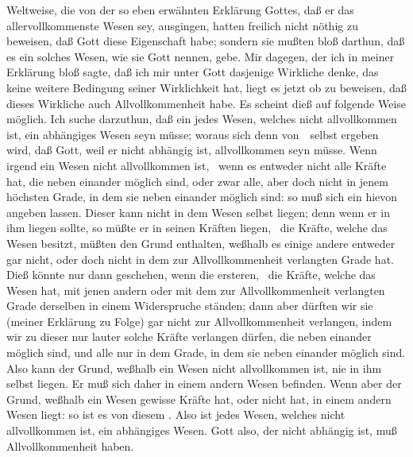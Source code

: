 \begin{aufza}
\item Weltweise, die von der so eben erwähnten Erklärung Gottes, daß er das allervollkommenste Wesen sey, ausgingen, hatten freilich nicht nöthig zu beweisen, daß Gott diese Eigenschaft habe; sondern sie mußten bloß darthun, daß es ein solches Wesen, wie sie Gott nennen, gebe. Mir dagegen, der ich in meiner Erklärung bloß sagte, daß ich mir unter Gott dasjenige Wirkliche denke, das keine weitere Bedingung seiner Wirklichkeit hat, liegt es jetzt ob zu beweisen, daß dieses Wirkliche auch Allvollkommenheit habe. Es scheint dieß auf folgende Weise möglich. Ich suche darzuthun, daß ein jedes Wesen, welches nicht allvollkommen ist, ein abhängiges Wesen seyn müsse; woraus sich denn von~\ selbst ergeben wird, daß Gott, weil er nicht abhängig ist, allvollkommen seyn müsse. Wenn irgend ein Wesen nicht allvollkommen ist, \dh\ wenn es entweder nicht alle Kräfte hat, die neben einander möglich sind, oder zwar alle, aber doch nicht in jenem höchsten Grade, in dem sie neben einander möglich sind: so muß sich ein  hievon angeben lassen. Dieser kann nicht in dem Wesen selbst liegen; denn wenn er in ihm liegen sollte, so müßte er in seinen Kräften liegen, \dh\ die Kräfte, welche das Wesen besitzt, müßten den Grund enthalten, weßhalb es einige andere entweder gar nicht, oder doch nicht in dem zur Allvollkommenheit verlangten Grade hat. Dieß könnte nur dann geschehen, wenn die ersteren, \dh\ die Kräfte, welche das Wesen hat, mit jenen andern oder mit dem zur Allvollkommenheit verlangten Grade derselben in einem Widerspruche ständen; dann aber dürften wir sie (meiner Erklärung zu Folge) gar nicht zur Allvollkommenheit verlangen, indem wir zu dieser nur lauter solche Kräfte verlangen dürfen, die neben einander möglich sind, und alle nur in dem Grade, in dem sie neben einander möglich sind. Also kann der Grund, weßhalb ein Wesen nicht allvollkommen ist, nie in ihm selbst liegen. Er muß sich daher in einem andern Wesen befinden. Wenn aber der Grund, weßhalb ein Wesen gewisse Kräfte hat, oder nicht hat, in einem andern Wesen liegt: so ist es von diesem . Also ist jedes Wesen, welches nicht allvollkommen ist, ein abhängiges Wesen. Gott also, der nicht abhängig ist, muß Allvollkommenheit haben.
\end{aufza}

